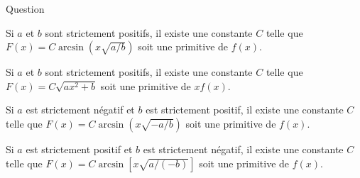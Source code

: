 \begin{multi}{Question}
    \item Si \(a\) et \(b\) sont strictement positifs, il existe une constante \(C\) telle que \(F(x)=C\arcsin \left(x\sqrt{a/b}\right)\) soit une primitive de \(f(x)\).
    \item* Si \(a\) et \(b\) sont strictement positifs, il existe une constante \(C\) telle que \(F(x)=C\sqrt{ax^2+b}\) soit une primitive de \(xf(x)\).
    \item* Si \(a\) est strictement négatif et \(b\) est strictement positif, il existe une constante \(C\) telle que \(F(x)=C\arcsin \left(x\sqrt{-a/b}\right)\) soit une primitive de \(f(x)\).
    \item Si \(a\) est strictement positif et \(b\) est strictement négatif, il existe une constante \(C\) telle que \(F(x)=C\arcsin \left[x\sqrt{a/(-b)}\right]\) soit une primitive de \(f(x)\).
\end{multi}
